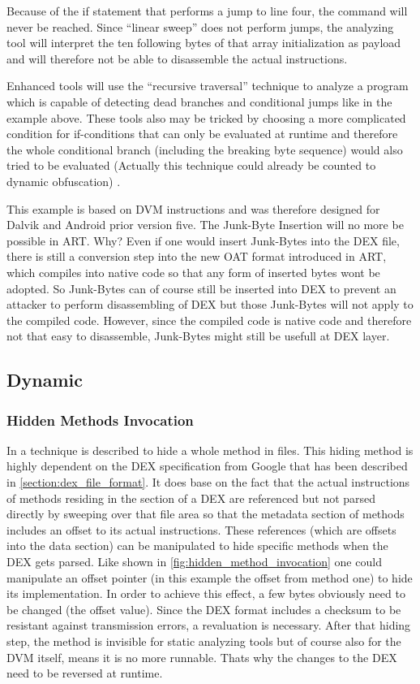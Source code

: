 Because of the if statement that performs a jump to line four, the  command will never be reached.
Since ``linear sweep'' does not perform jumps, the analyzing tool
will interpret the ten following bytes of that array initialization as payload and will therefore not be able to disassemble the actual instructions.

Enhanced tools will use the ``recursive traversal'' technique to analyze a
program which is capable of detecting dead branches and conditional jumps like in the example above.
These tools also may be tricked by choosing a more complicated condition for
if-conditions that can only be evaluated at runtime and therefore the
whole conditional branch (including the breaking byte sequence) would also tried to be evaluated (Actually this technique could already be counted to dynamic obfuscation) \parencite[p.68]{lvl_imp}.


This example is based on DVM instructions and was therefore designed for Dalvik and
Android prior version five. 
The Junk-Byte Insertion will no more be possible in ART. Why? 
Even if one would insert Junk-Bytes into the DEX file, there is still a conversion
step into the new OAT format introduced in ART, which compiles into native code so 
that any form of inserted bytes wont be adopted. So Junk-Bytes can of course still
be inserted into DEX to prevent an attacker to perform disassembling of DEX but those
Junk-Bytes will not apply to the compiled code. However, since the compiled code
is native code and therefore not that easy to disassemble, Junk-Bytes might still be
usefull at DEX layer.

\subsection{Dynamic}
\subsubsection{Hidden Methods Invocation}
In \parencite[p.82f]{lvl_imp} a technique is described to hide a whole method
in  files. This hiding method is highly dependent on the DEX specification from Google \parencite{dex} that has been described in
\autoref{section:dex_file_format}.
It does base on the fact that the actual instructions of methods residing
in the  section of a DEX are referenced but not parsed directly
by sweeping over that file area so that the metadata section of methods
includes an offset to its actual instructions.
These references (which are offsets into the data section) can be manipulated
to hide specific methods when the DEX gets parsed. Like shown in
 \autoref{fig:hidden_method_invocation} one could manipulate
 an offset pointer (in this example the offset from method one)
to hide its implementation.
In order to achieve this effect, a few bytes obviously need to be changed
(the offset value).
Since the DEX format includes a checksum to be resistant
against transmission errors, a revaluation is necessary.
After that hiding step, the method is invisible for static analyzing tools
but of course also for the DVM itself, means it is no more runnable.
Thats why the changes to the DEX need to be reversed at runtime.

